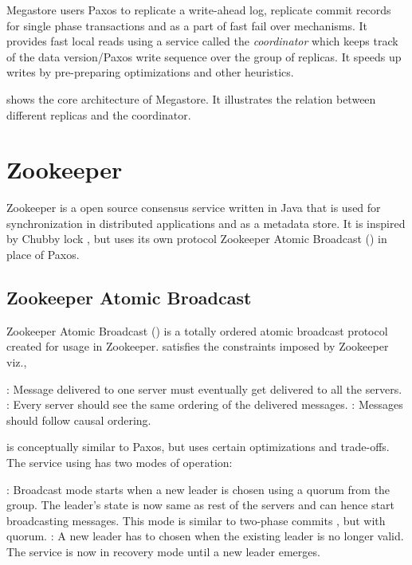 Megastore users Paxos to replicate a write-ahead log, replicate commit
records for single phase  transactions and as a part of fast fail
over
mechanisms. It provides fast local reads using a service called the
\emph{coordinator} which keeps track of the data version/Paxos write
sequence over the group of replicas. It speeds up writes by pre-preparing
optimizations and other heuristics.

 shows the core architecture of Megastore. It illustrates
the relation between different replicas and the coordinator.

\section{Zookeeper}
\label{section:zookeeper}

Zookeeper \citep{Hunt:2010:ZWC:1855840.1855851, zookeeper} is a open source
consensus service written in Java that is used for synchronization in
distributed applications and as a metadata store. It is inspired by Chubby lock
, but uses its own protocol Zookeeper Atomic Broadcast
() in place of Paxos.

\subsection{Zookeeper Atomic Broadcast}

Zookeeper Atomic Broadcast ()
\citep{Reed:2008:STO:1529974.1529978, JunqueiraRS11} is a
totally ordered atomic broadcast protocol created for usage in Zookeeper. 
satisfies the constraints imposed by Zookeeper viz.,

\begin{itemize}
    : Message delivered to one server must eventually
    get delivered to all the servers.
    : Every server should see the same ordering of the
    delivered messages.
    : Messages should follow causal%
    ordering.
\end{itemize}

 is conceptually similar to Paxos, but uses certain optimizations and
trade-offs. The service using  has two modes of operation:

\begin{itemize}
    : Broadcast mode starts when a new leader is chosen
    using a quorum from the group. The leader's state is now same as rest of
    the servers and can hence start broadcasting messages.
    This mode is similar to two-phase commits \citep{Gray78}, but with quorum.
    : A new leader has to chosen when the existing leader
    is no longer valid. The service is now in recovery mode until a new leader
    emerges.
\end{itemize}

